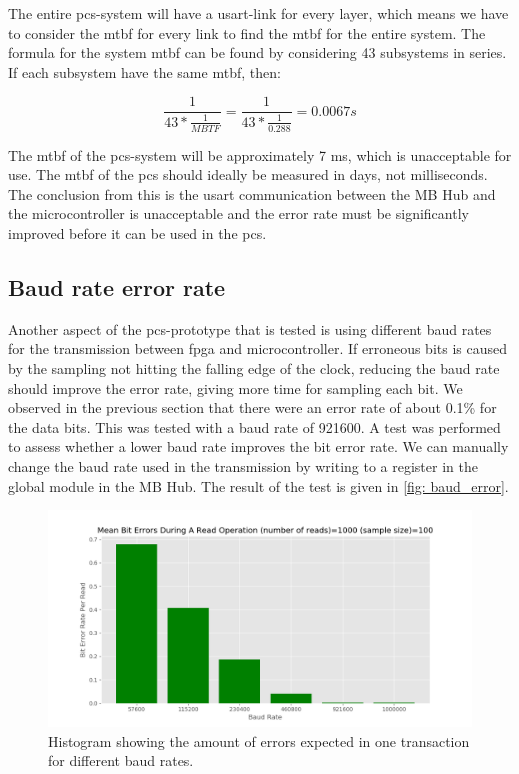 \documentclass[main.tex]{subfiles}
\begin{document}
The entire \gls{pcs}-system will have a \gls{usart}-link for every layer, which means we have to consider the \gls{mtbf} for every link to find the \gls{mtbf} for the entire system. The formula for the system \gls{mtbf} can be found by considering 43 subsystems in series\cite{mtbf_calc}. If each subsystem have the same \gls{mtbf}, then:

\begin{equation}
    \frac{1}{43*\frac{1}{MBTF}} = \frac{1}{43*\frac{1}{0.288}} = 0.0067s
\end{equation}

The \gls{mtbf} of the \gls{pcs}-system will be approximately 7 ms, which is unacceptable for use. The \gls{mtbf} of the \gls{pcs} should ideally be measured in days, not milliseconds. The conclusion from this is the \gls{usart} communication between the MB Hub and the microcontroller is unacceptable and the error rate must be significantly improved before it can be used in the \gls{pcs}.



\subsection{Baud rate error rate}
\label{ssec:baud_error}
Another aspect of the \gls{pcs}-prototype that is tested is using different baud rates for the transmission between \gls{fpga} and microcontroller. If erroneous bits is caused by the sampling not hitting the falling edge of the clock, reducing the baud rate should improve the error rate, giving more time for sampling each bit. We observed in the previous section that there were an error rate of about 0.1\% for the data bits. This was tested with a baud rate of 921600. A test was performed to assess whether a lower baud rate improves the bit error rate. We can manually change the baud rate used in the transmission by writing to a register in the global module in the MB Hub. The result of the test is given in \autoref{fig: baud_error}.

\begin{figure}[!ht]
    \centering
    \includegraphics[width=18cm]{images/baud_error_rate.png}
    \caption{Histogram showing the amount of errors expected in one transaction for different baud rates.}
    \label{fig: baud_error}
\end{figure}
\FloatBarrier
\end{document}
